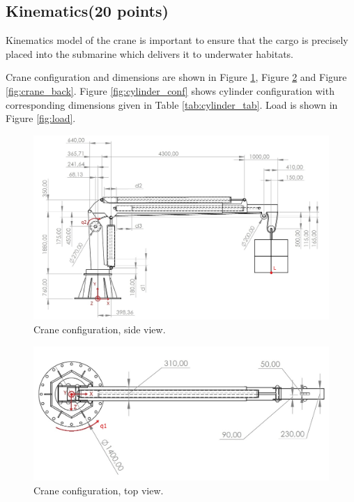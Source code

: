 \documentclass[openany]{book}
\begin{document}
	\subsection{Kinematics(20 points)}
	
	Kinematics model of the crane is important to ensure that the cargo is 
	precisely placed into the submarine which delivers it to underwater 
	habitats.
	
	Crane configuration and dimensions are shown in Figure 
	\ref{fig:crane_side}, Figure \ref{fig:crane_top} and Figure 
	\ref{fig:crane_back}. Figure \ref{fig:cylinder_conf} shows cylinder 
	configuration with corresponding dimensions given in Table 
	\ref{tab:cylinder_tab}. Load is shown in Figure \ref{fig:load}.
	
	\begin{figure}[h!]
		\centering
		\includegraphics[width=\textwidth]{kran_bokocrt.jpg}
		\caption{Crane configuration, side view.}
		\label{fig:crane_side}
	\end{figure}
	
	\begin{figure}[h!]
		\centering
		\includegraphics[width=\textwidth]{kran_tlocrt.jpg}
		\caption{Crane configuration, top view.}
		\label{fig:crane_top}
	\end{figure}
	
\end{document}
